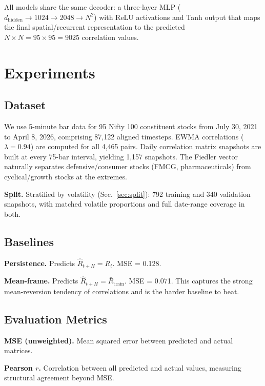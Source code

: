 \documentclass[runningheads]{llncs}
\begin{document}
All models share the same decoder: a three-layer MLP
($d_{\text{hidden}} \to 1024 \to 2048 \to N^2$) with ReLU activations
and Tanh output that maps the final spatial/recurrent representation to
the predicted $N \times N = 95 \times 95 = 9025$ correlation values.
\section{Experiments}\label{sec:experiments}

\subsection{Dataset}

We use 5-minute bar data for 95 Nifty 100 constituent stocks from
July 30, 2021 to April 8, 2026, comprising 87,122 aligned timesteps.
EWMA correlations ($\lambda=0.94$) are computed for all 4,465 pairs.
Daily correlation matrix snapshots are built at every 75-bar interval,
yielding 1,157 snapshots. The Fiedler vector naturally separates
defensive/consumer stocks (FMCG, pharmaceuticals) from cyclical/growth
stocks at the extremes.

\textbf{Split.} Stratified by volatility (Sec.~\ref{sec:split}):
792 training and 340 validation snapshots, with matched volatile
proportions and full date-range coverage in both.

\subsection{Baselines}

\textbf{Persistence.} Predicts $\hat{R}_{t+H} = R_t$. MSE = 0.128.

\textbf{Mean-frame.} Predicts $\hat{R}_{t+H} = \bar{R}_{\text{train}}$.
MSE = 0.071. This captures the strong mean-reversion tendency of
correlations and is the harder baseline to beat.

\subsection{Evaluation Metrics}

\textbf{MSE (unweighted).} Mean squared error between predicted and
actual matrices.

\textbf{Pearson $r$.} Correlation between all predicted and actual
values, measuring structural agreement beyond MSE.
\end{document}
